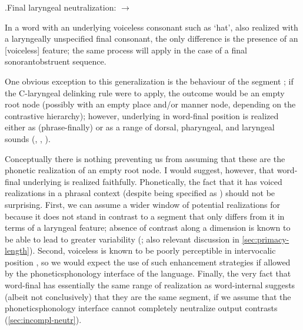 \ex.\setlength\level{10mm}\label{ex:kog-fln}Final laryngeal neutralization:  $\rightarrow$ \ipa{[kɔɡ̊]}\\

In a word with an underlying voiceless consonant such as  `hat', also realized with a laryngeally unspecified final consonant, the only difference is the presence of an [voiceless] feature; the same process will apply in the case of a final sonorant\endash obstruent sequence.

One obvious exception to this generalization is the behaviour of the segment \ipa{[h]}; if the C-laryngeal delinking rule were to apply, the outcome would be an empty root node (possibly with an empty place and/or manner node, depending on the contrastive hierarchy); however, underlying \ipa{[h]} in word-final position is realized either as  (phrase-finally) or as a range of dorsal, pharyngeal, and laryngeal sounds (, , ).

Conceptually there is nothing preventing us from assuming that these are the phonetic realization of an empty root node. I would suggest, however, that word-final underlying \ipa{[h]} is realized faithfully. Phonetically, the fact that it has voiced realizations in a phrasal context (despite being specified as ) should not be surprising. First, we can assume a wider window of potential realizations for \ipa{[h]} because it does not stand in contrast to a segment that only differs from it in terms of a laryngeal feature; absence of contrast along a dimension is known to be able to lead to greater variability (\citealp{dyck,alphen07:_prevoic_dutch}; \cf also relevant discussion in \cref{sec:primacy-length}). Second, voiceless \ipa{[h]} is known to be poorly perceptible in intervocalic position \citep{mielke03}, so we would expect the use of such enhancement strategies if allowed by the phonetics\endash phonology interface of the language. Finally, the very fact that word-final \ipa{[h]} has essentially the same range of realization as word-internal \ipa{[h]} suggests (albeit not conclusively) that they are the same segment, if we assume that the phonetics\endash phonology interface cannot completely neutralize output contrasts (\cref{sec:incompl-neutr}).

